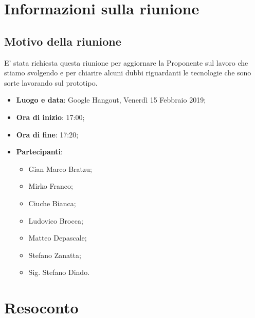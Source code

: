 \documentclass[a4paper,12pt]{article}
\begin{document}
	\tableofcontents
	\cleardoublepage
	\section{Informazioni sulla riunione}
	\subsection{Motivo della riunione}E' stata richiesta questa riunione per aggiornare la Proponente sul lavoro che stiamo svolgendo e per chiarire alcuni dubbi riguardanti le tecnologie che sono sorte lavorando sul prototipo.
	
	\begin{itemize}
		\item \textbf{Luogo e data}: Google Hangout, Venerdì 15 Febbraio 2019;
		\item \textbf{Ora di inizio}: 17:00;
		\item \textbf{Ora di fine}: 17:20;
		\item \textbf{Partecipanti}:  
		\begin{itemize}
			\item Gian Marco Bratzu;
			\item Mirko Franco;
			\item Ciuche Bianca;
			\item Ludovico Brocca;
			\item Matteo Depascale;
			\item Stefano Zanatta;
			\item Sig. Stefano Dindo.
		\end{itemize}
	\end{itemize}
	
	
	\section{Resoconto}
\end{document}

